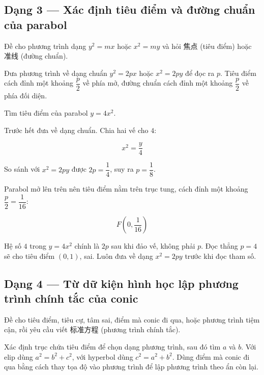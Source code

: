 \documentclass[11pt, a4paper]{article}
\begin{document}
\subsection{Dạng 3 — Xác định tiêu điểm và đường chuẩn của parabol}

 Đề cho phương trình dạng $y^2 = mx$ hoặc $x^2 = my$ và hỏi 焦点 (tiêu điểm) hoặc 准线 (đường chuẩn).

 Đưa phương trình về dạng chuẩn $y^2 = 2px$ hoặc $x^2 = 2py$ để đọc ra $p$. Tiêu điểm cách đỉnh một khoảng $\dfrac{p}{2}$ về phía mở, đường chuẩn cách đỉnh một khoảng $\dfrac{p}{2}$ về phía đối diện.

\begin{vidu}[{3}]
Tìm tiêu điểm của parabol $y = 4x^2$.

Trước hết đưa về dạng chuẩn. Chia hai vế cho $4$:

$$x^2 = \frac{y}{4}$$

So sánh với $x^2 = 2py$ được $2p = \dfrac{1}{4}$, suy ra $p = \dfrac{1}{8}$.

Parabol mở lên trên nên tiêu điểm nằm trên trục tung, cách đỉnh một khoảng $\dfrac{p}{2} = \dfrac{1}{16}$:

$$F\left(0, \frac{1}{16}\right)$$

 Hệ số $4$ trong $y = 4x^2$ chính là $2p$ sau khi đảo vế, không phải $p$. Đọc thẳng $p = 4$ sẽ cho tiêu điểm $(0, 1)$, sai. Luôn đưa về dạng $x^2 = 2py$ trước khi đọc tham số.

\end{vidu}
\subsection{Dạng 4 — Từ dữ kiện hình học lập phương trình chính tắc của conic}

 Đề cho tiêu điểm, tiêu cự, tâm sai, điểm mà conic đi qua, hoặc phương trình tiệm cận, rồi yêu cầu viết 标准方程 (phương trình chính tắc).

 Xác định trục chứa tiêu điểm để chọn dạng phương trình, sau đó tìm $a$ và $b$. Với elip dùng $a^2 = b^2 + c^2$, với hyperbol dùng $c^2 = a^2 + b^2$. Dùng điểm mà conic đi qua bằng cách thay tọa độ vào phương trình để lập phương trình theo ẩn còn lại.
\end{document}

